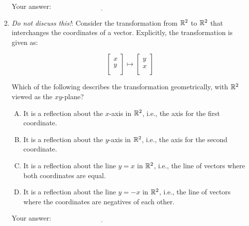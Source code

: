 \documentclass[10pt]{amsart}
\begin{document}
\begin{enumerate}
  \vspace{0.1in}
  Your answer: $\underline{\qquad\qquad\qquad\qquad\qquad\qquad\qquad}$
  \vspace{0.1in}

\item {\em Do not discuss this!}: Consider the transformation from
  $\mathbb{R}^2$ to $\mathbb{R}^2$ that interchanges the coordinates of a
  vector. Explicitly, the transformation is given as:

  $$\left[\begin{matrix} x \\ y \\\end{matrix}\right] \mapsto \left[\begin{matrix} y \\ x \\\end{matrix}\right]$$

  Which of the following describes the transformation geometrically,
  with $\mathbb{R}^2$ viewed as the $xy$-plane?
  \begin{enumerate}[(A)]
  \item It is a reflection about the $x$-axis in $\mathbb{R}^2$, i.e., the
    axis for the first coordinate.
  \item It is a reflection about the $y$-axis in $\mathbb{R}^2$, i.e., the
    axis for the second coordinate.
  \item It is a reflection about the line $y = x$ in $\mathbb{R}^2$, i.e., the
    line of vectors where both coordinates are equal.
  \item It is a reflection about the line $y = -x$ in $\mathbb{R}^2$, i.e.,
    the line of vectors where the coordinates are negatives of each
    other.
  \end{enumerate}

  \vspace{0.1in}
  Your answer: $\underline{\qquad\qquad\qquad\qquad\qquad\qquad\qquad}$
  \vspace{0.1in}

\end{enumerate}
\end{document}
